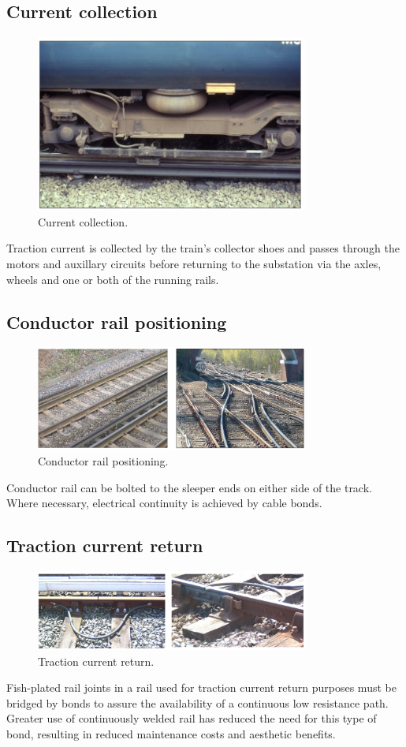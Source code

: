 \subsection{Current collection}
\begin{figure}[H]
    \centering
    \includegraphics[width = 0.8\textwidth]{img/figure125.png}
    \caption{Current collection.}
\end{figure}
Traction current is collected by the train's collector shoes and passes through the motors and auxillary circuits before returning to the substation via the axles, wheels and one or both of the running rails. 
\subsection{Conductor rail positioning}
\begin{figure}[H]
    \centering
    \includegraphics[width = 0.8\textwidth]{img/figure126.png}
    \caption{Conductor rail positioning.}
\end{figure}
Conductor rail can be bolted to the sleeper ends on either side of the track. Where necessary, electrical continuity is achieved by cable bonds. 
\subsection{Traction current return}
\begin{figure}[H]
    \centering
    \includegraphics[width = 0.8\textwidth]{img/figure127.png}
    \caption{Traction current return.}
\end{figure}
Fish-plated rail joints in a rail used for traction current return purposes must be bridged by bonds to assure the availability of a continuous low resistance path. Greater use of continuously welded rail has reduced the need for this type of bond, resulting in reduced maintenance costs and aesthetic benefits. 
